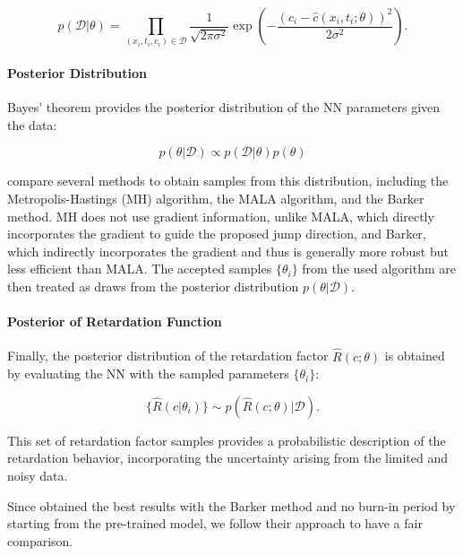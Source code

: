 \begin{equation}
p(\mathcal{D} | \theta) = \prod_{(x_i, t_i, c_i) \in \mathcal{D}} \frac{1}{\sqrt{2\pi \sigma^2}} \exp \left( -\frac{(c_i - \hat{c}(x_i,t_i;\theta))^2}{2\sigma^2} \right) .
\label{eq:likelihood}
\end{equation}

\paragraph{Posterior Distribution}

Bayes' theorem provides the posterior distribution of the NN parameters given the data:

\begin{equation*}
p(\theta | \mathcal{D}) \propto p(\mathcal{D} | \theta) p(\theta)
\end{equation*}

\textcite{finn} compare several methods to obtain samples from this distribution, including the Metropolis-Hastings (MH) algorithm, the MALA algorithm, and the Barker method. MH does not use gradient information, unlike MALA, which directly incorporates the gradient to guide the proposed jump direction, and Barker, which indirectly incorporates the gradient and thus is generally more robust but less efficient than MALA.
The accepted samples $\{\theta_i\}$ from the used algorithm are then treated as draws from the posterior distribution $p(\theta | \mathcal{D})$.

\paragraph{Posterior of Retardation Function}

Finally, the posterior distribution of the retardation factor $\hat{R}(c;\theta)$ is obtained by evaluating the NN with the sampled parameters $\{\theta_i\}$:

\begin{equation*}
\{\hat{R}(c | \theta_i)\} \sim p(\hat{R}(c;\theta) | \mathcal{D}) .
\end{equation*}

This set of retardation factor samples provides a probabilistic description of the retardation behavior, incorporating the uncertainty arising from the limited and noisy data.

Since \textcite{finn} obtained the best results with the Barker method and no burn-in period by starting from the pre-trained model, we follow their approach to have a fair comparison.



